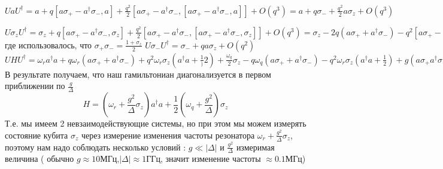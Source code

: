 \documentclass[12pt, a4paper, openany]{book}
\begin{document}
\begin{center}
$
UaU^{\dagger} = a +q[a\sigma_+-a^{\dagger}\sigma_-,a]+
\frac{q^2}{2}[a\sigma_+-a^{\dagger}\sigma_-,[a\sigma_+-a^{\dagger}\sigma_-,a]]+O(q^3)=
a+q\sigma_-+\frac{q^2}{2}a\sigma_z+O(q^3)
$

$
U\sigma_zU^{\dagger} = \sigma_z +q[a\sigma_+-a^{\dagger}\sigma_-,\sigma_z]+
\frac{q^2}{2}[a\sigma_+-a^{\dagger}\sigma_-,[a\sigma_+-a^{\dagger}\sigma_-,\sigma_z]]+O(q^3)=
\sigma_z-2q(a\sigma_++a^{\dagger}\sigma_-)-q^2
[a\sigma_+- 
a^{\dagger}\sigma_-,a\sigma_++a^{\dagger}\sigma_-]+O(q^3)=
\sigma_z-2q(a\sigma_++a^{\dagger}\sigma_-)-q^2\sigma_z
(1+2a^{\dagger}a)+O(q^3)
$
где использовалось, что $\sigma_+\sigma_-=
\frac{1+\sigma_z}{2}$
$U\sigma_-U^{\dagger}=\sigma_-+qa\sigma_z+O(q^2)$
$
UHU^{\dagger}=\omega_r a^{\dagger}a+
q\omega_r(a\sigma_++a^{\dagger}\sigma_-)+
q^2\omega_r\sigma_z(a^{\dagger}a+\frac{1}){2})+\frac{\omega_q}{2}\sigma_z-
q\omega_q(a\sigma_++a^{\dagger}\sigma_-)
-q^2\omega_r\sigma_z(a^{\dagger}a+\frac{1}{2})+
g(a\sigma_+a^{\dagger}\sigma_-)+qg\sigma_z(2a^{\dagger}a+1)+
O(q^2)=\omega_r a^{\dagger}a+\frac{\omega_z}{2}\sigma_z+
qg\sigma_z(a^{\dagger}a+\frac{1}{2})+O(q^2)
$
В результате получаем, что наш гамильтониан диагонализуется
в первом приближении по $\frac{g}{\Delta}$
\begin{equation}
H=(\omega_r+\frac{g^2}{\Delta}\sigma_z)a^{\dagger}a + 
\frac{1}{2}(\omega_q+\frac{g^2}{\Delta})\sigma_z
\end{equation} 
Т.е. мы имеем 2 невзаимодействующие системы, но при этом мы можем измерять состояние кубита $\sigma_z$ через измерение изменения
частоты резонатора $\omega_r+\frac{g^2}{\Delta}\sigma_z$, поэтому нам надо соблюдать несколько условий : $g\ll|\Delta|$ и 
$\frac{g^2}{\Delta}$ измеримая величина ( обычно $g\approx10$МГц,$|\Delta|\approx1$ГГц, значит изменение частоты $\approx0.1$МГц)
\end{center}
\end{document}
